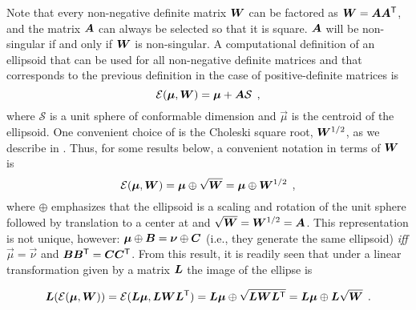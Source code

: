 Note that every non-negative definite matrix $\bm{W}$ can be factored as $\bm{W}=\bm{A}\bm{A}^\mathsf{T}$,
and the matrix $\bm{A}$ can always be selected so that it is square.
$\bm{A}$ will be non-singular if and only if $\bm{W}$ is non-singular.
A computational
definition of an ellipsoid that can be used for all non-negative definite matrices and that corresponds to the previous definition in the case of positive-definite matrices is
\begin{equation}\label{eq:ellAS}
\mathcal{E}(\bm{\mu},\bm{W}) = \bm{\mu} + \bm{A} \mathcal{S} \:\: ,
\end{equation}
where $\mathcal{S}$ is a unit sphere of conformable dimension and $\vec{\mu}$ is the centroid of the ellipsoid.
One convenient choice of  is the Choleski square root, $\bm{W}^{1/2}$, as we describe in .
Thus, for some results below, a convenient notation in terms of $\bm{W}$ is
\begin{equation}\label{eq:ellipsoidW}
\mathcal{E}(\bm{\mu}, \bm{W}) = \bm{\mu} \oplus \sqrt{\bm{W}} = \bm{\mu} \oplus \bm{W}^{1/2} \:\: ,
\end{equation}
where $\oplus$
emphasizes that the ellipsoid is a scaling and rotation of the unit sphere followed by translation to
a center at \vec{\mu} and $\sqrt{\bm{W}}=\bm{W}^{1/2}=\bm{A}$. This representation is not unique,
however:  $\bm{\mu} \oplus \bm{B} = \bm{\nu} \oplus \bm{C}$ (i.e., they generate the same ellipsoid)
\emph{iff} $\vec{\mu} = \vec{\nu}$ and $\bm{B}\bm{B}^\mathsf{T} = \bm{C}\bm{C}^\mathsf{T}$.
From this result, it is readily seen that under a linear transformation given by a matrix
$\bm{L}$
the image of the ellipse is

\begin{equation*}
\bm{L}(\mathcal{E}(\bm{\mu} ,\bm{W}))=\mathcal{E}(\bm{L}\bm{\mu} ,\bm{L}\bm{W}{\bm{L}}^\mathsf{T})=\bm{L}\bm{\mu} \oplus \sqrt{\bm{L}\bm{W}{\bm{L}}^\mathsf{T}}=\bm{L}\bm{\mu} \oplus \bm{L}\sqrt{\bm{W}} \:\: .
\end{equation*}

